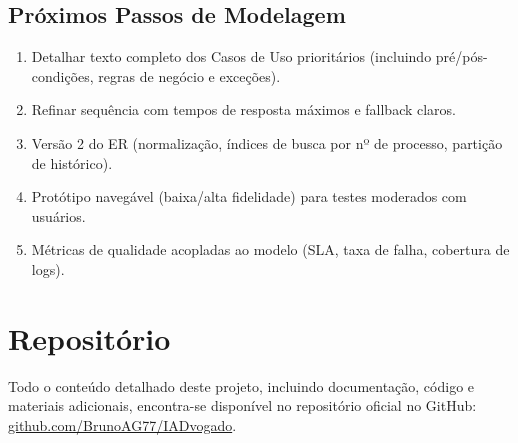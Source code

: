 \documentclass{article}
\begin{document}
\subsection{Próximos Passos de Modelagem}
\begin{enumerate}
    \item Detalhar texto completo dos Casos de Uso prioritários (incluindo pré/pós-condições, regras de negócio e exceções).
    \item Refinar sequência com tempos de resposta máximos e fallback claros.
    \item Versão 2 do ER (normalização, índices de busca por nº de processo, partição de histórico).
    \item Protótipo navegável (baixa/alta fidelidade) para testes moderados com usuários.
    \item Métricas de qualidade acopladas ao modelo (SLA, taxa de falha, cobertura de logs).
\end{enumerate}

\section{Repositório}
Todo o conteúdo detalhado deste projeto, incluindo documentação, código e materiais adicionais, encontra-se disponível no repositório oficial no GitHub: \href{https://github.com/BrunoAG77/IADvogado}{github.com/BrunoAG77/IADvogado}.
\end{document}
